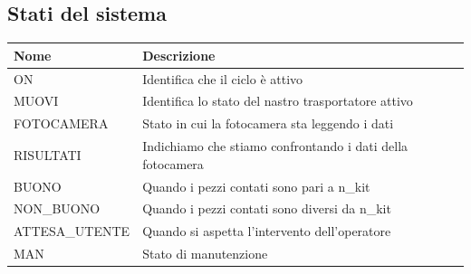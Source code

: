 \documentclass{article}
\begin{document}
\subsection{Stati del sistema}
\begin{center}
    \begin{tabular}{l l}
        \toprule
        \textbf{Nome}  & \textbf{Descrizione}                                       \\
        \midrule
        \midrule

        ON             & Identifica che il ciclo è attivo                           \\
        \midrule
        MUOVI          & Identifica lo stato del nastro trasportatore attivo        \\
        \midrule
        FOTOCAMERA     & Stato in cui la fotocamera sta leggendo i dati             \\
        \midrule
        RISULTATI      & Indichiamo che stiamo confrontando i dati della fotocamera \\
        \midrule
        BUONO          & Quando i pezzi contati sono pari a n\_kit                  \\
        \midrule
        NON\_BUONO     & Quando i pezzi contati sono diversi da n\_kit              \\
        \midrule
        ATTESA\_UTENTE & Quando si aspetta l'intervento dell'operatore              \\
        \midrule
        MAN            & Stato di manutenzione                                      \\

        \bottomrule
    \end{tabular}
\end{center}
\end{document}
